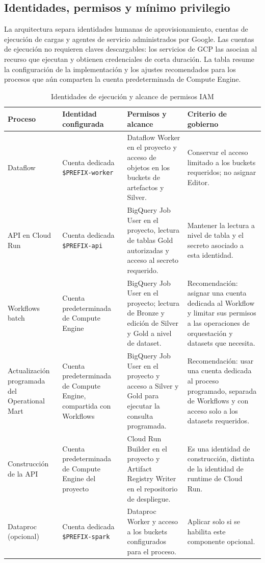 \documentclass[11pt,a4paper]{article}
\begin{document}
\subsection{Identidades, permisos y mínimo privilegio}
La arquitectura separa identidades humanas de aprovisionamiento, cuentas de ejecución de cargas y agentes de servicio administrados por Google. Las cuentas de ejecución no requieren claves descargables: los servicios de GCP las asocian al recurso que ejecutan y obtienen credenciales de corta duración. La tabla resume la configuración de la implementación y los ajustes recomendados para los procesos que aún comparten la cuenta predeterminada de Compute Engine.
\begin{table}[H]
\caption{Identidades de ejecución y alcance de permisos IAM}\label{tab:iam}
\small\begin{tabularx}{\linewidth}{@{}P{.22\linewidth}P{.25\linewidth}YY@{}}\toprule
Proceso & Identidad configurada & Permisos y alcance & Criterio de gobierno\\\midrule
Dataflow & Cuenta dedicada \texttt{\${PREFIX}-worker} & Dataflow Worker en el proyecto y acceso de objetos en los buckets de artefactos y Silver. & Conservar el acceso limitado a los buckets requeridos; no asignar Editor.\\
API en Cloud Run & Cuenta dedicada \texttt{\${PREFIX}-api} & BigQuery Job User en el proyecto, lectura de tablas Gold autorizadas y acceso al secreto requerido. & Mantener la lectura a nivel de tabla y el secreto asociado a esta identidad.\\
Workflows batch & Cuenta predeterminada de Compute Engine & BigQuery Job User en el proyecto; lectura de Bronze y edición de Silver y Gold a nivel de dataset. & Recomendación: asignar una cuenta dedicada al Workflow y limitar sus permisos a las operaciones de orquestación y datasets que necesita.\\
Actualización programada del Operational Mart & Cuenta predeterminada de Compute Engine, compartida con Workflows & BigQuery Job User en el proyecto y acceso a Silver y Gold para ejecutar la consulta programada. & Recomendación: usar una cuenta dedicada al proceso programado, separada de Workflows y con acceso solo a los datasets requeridos.\\
Construcción de la API & Cuenta predeterminada de Compute Engine del proyecto & Cloud Run Builder en el proyecto y Artifact Registry Writer en el repositorio de despliegue. & Es una identidad de construcción, distinta de la identidad de runtime de Cloud Run.\\
Dataproc (opcional) & Cuenta dedicada \texttt{\${PREFIX}-spark} & Dataproc Worker y acceso a los buckets configurados para el proceso. & Aplicar solo si se habilita este componente opcional.\\\bottomrule
\end{tabularx}
\end{table}
\end{document}
